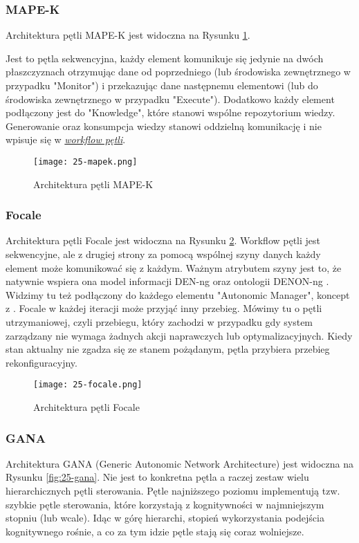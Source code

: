 \subsubsection{MAPE-K}
Architektura pętli MAPE-K \cite{kephart2003} jest widoczna na Rysunku \ref{fig:25-mapek}.

Jest to pętla sekwencyjna, każdy element komunikuje się jedynie na dwóch płaszczyznach otrzymując dane od poprzedniego (lub środowiska zewnętrznego w przypadku "Monitor") i przekazując dane następnemu elementowi (lub do środowiska zewnętrznego w przypadku "Execute"). Dodatkowo każdy element podłączony jest do "Knowledge", które stanowi wspólne repozytorium wiedzy. Generowanie oraz konsumpcja wiedzy stanowi oddzielną komunikację i nie wpisuje się w \hyperlink{def:workflow}{\textit{workflow pętli}}. 

\begin{figure}[!h]
    \centering \texttt{[image: 25-mapek.png]}
    \caption{Architektura pętli MAPE-K}\label{fig:25-mapek}
\end{figure}

\subsubsection{Focale}
Architektura pętli Focale \cite{strassner2007} jest widoczna na Rysunku \ref{fig:25-focale}. Workflow pętli jest sekwencyjne, ale z drugiej strony za pomocą wspólnej szyny danych każdy element może komunikować się z każdym. Ważnym atrybutem szyny jest to, że natywnie wspiera ona model informacji DEN-ng \cite{strassner2003} oraz ontologii DENON-ng \cite{strassner2007}. Widzimy tu też podłączony do każdego elementu "Autonomic Manager", koncept z \cite{kephart2003}. Focale w każdej iteracji może przyjąć inny przebieg. Mówimy tu o pętli utrzymaniowej, czyli przebiegu, który zachodzi w przypadku gdy system zarządzany nie wymaga żadnych akcji naprawczych lub optymalizacyjnych. Kiedy stan aktualny nie zgadza się ze stanem pożądanym, pętla przybiera przebieg rekonfiguracyjny.

\begin{figure}[!h]
    \centering \texttt{[image: 25-focale.png]}
    \caption{Architektura pętli Focale}\label{fig:25-focale}
\end{figure}

\subsubsection{GANA}
Architektura GANA (Generic Autonomic Network Architecture) \cite{etsigana2018} jest widoczna na Rysunku \ref{fig:25-gana}. Nie jest to konkretna pętla a raczej zestaw wielu hierarchicznych pętli sterowania. Pętle najniższego poziomu implementują tzw. szybkie pętle sterowania, które korzystają z kognitywności w najmniejszym stopniu (lub wcale). Idąc w górę hierarchi, stopień wykorzystania podejścia kognitywnego rośnie, a co za tym idzie pętle stają się coraz wolniejsze. 

